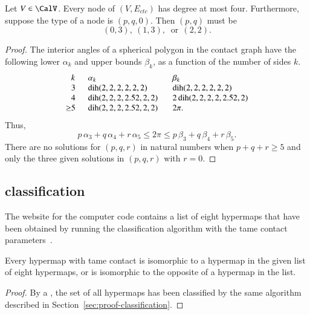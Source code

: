 \documentclass{llncs}
\def\op#1{{\hbox{#1}}}
\begin{document}
\begin{lemma}[]\label{lemma:no-5} 
  Let $V\in \CalV$.  Every node of $(V,E_{ctc})$ has degree at most
  four.  Furthermore, suppose the type of a node is $(p,q,0)$.  Then
  $(p,q)$ must be
\[
(0,3),~(1,3),~\text{ or}~~(2,2).
\]
\end{lemma}

\begin{proof} The interior angles of a spherical polygon in the
  contact graph have the following lower $\alpha_k$ and upper bounds
  $\beta_k$, as a function of the number of sides $k$.
\begin{equation}
\begin{array}{lllll}
  \phantom{\ge}k~~&\alpha_k & \beta_k\\
  \phantom{\ge}3~~&\op{dih}(2,2,2,2,2,2)  &\op{dih}(2,2,2,2,2,2)\\
  \phantom{\ge}4~~&\op{dih}(2,2,2,2.52,2,2) &2\,\op{dih}(2,2,2,2,2.52,2)\\
  {\ge}5~~& \op{dih}(2,2,2,2.52,2,2) ~~~& 2\pi.
\end{array}
\end{equation}
Thus,
\[
  p\,\alpha_3 + q\,\alpha_4 +r\, \alpha_5 
\le 2\pi \le p\,\beta_3 + q\,\beta_4 + r \,\beta_5.
\]
There are no solutions for
$(p,q,r)$ in natural numbers when $p+q+r\ge 5$ and
 only the three given solutions in $(p,q,r)$ with $r=0$.
\end{proof}



\subsection{classification}

The website for the computer code  contains a list of eight hypermaps
that have been obtained by running the classification algorithm with
the tame contact parameters~\cite{website:FlyspeckProject}.

\begin{lemma}\cutrate{}
  \label{lemma:contact-classification} Every hypermap with tame
  contact is isomorphic to a hypermap in the given list of eight
  hypermaps, or is isomorphic to the opposite of a hypermap in the
  list.  %
\end{lemma}

\begin{proof}
  By a , %
 the set of all hypermaps has been classified by the same
  algorithm described in Section~\ref{sec:proof-classification}.
\end{proof}
\end{document}
